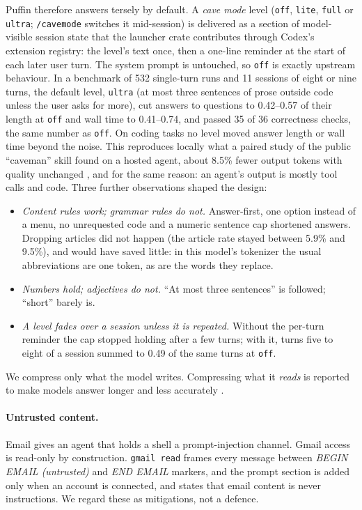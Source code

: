 \documentclass[11pt]{article}
\newcommand{\code}[1]{\texttt{#1}}
\begin{document}
Puffin therefore answers tersely by default. A \emph{cave mode} level (\code{off}, \code{lite},
\code{full} or \code{ultra}; \code{/cavemode} switches it mid-session) is delivered as a section of
model-visible session state that the launcher crate contributes through Codex's extension
registry: the level's text once, then a one-line reminder at the start of each later user turn.
The system prompt is untouched, so \code{off} is exactly upstream behaviour. In a benchmark of 532
single-turn runs and 11 sessions of eight or nine turns, the default level, \code{ultra} (at most
three sentences of prose outside code unless the user asks for more), cut answers to questions to
0.42--0.57 of their length at \code{off} and wall time to 0.41--0.74, and passed 35 of 36
correctness checks, the same number as \code{off}. On coding tasks no level moved answer length
or wall time beyond the noise. This reproduces locally what a paired study of the public
``caveman'' skill found on a hosted agent, about 8.5\% fewer output tokens with quality unchanged
\cite{shiryaev2026caveman}, and for the same reason: an agent's output is mostly tool calls and
code. Three further observations shaped the design:
\begin{itemize}
  \item \emph{Content rules work; grammar rules do not.} Answer-first, one option instead of a
    menu, no unrequested code and a numeric sentence cap shortened answers. Dropping articles
    did not happen (the article rate stayed between 5.9\% and 9.5\%), and would have saved little:
    in this model's tokenizer the usual abbreviations are one token, as are the words they replace.
  \item \emph{Numbers hold; adjectives do not.} ``At most three sentences'' is followed; ``short''
    barely is.
  \item \emph{A level fades over a session unless it is repeated.} Without the per-turn reminder
    the cap stopped holding after a few turns; with it, turns five to eight of a session summed to
    0.49 of the same turns at \code{off}.
\end{itemize}
We compress only what the model writes. Compressing what it \emph{reads} is reported to make
models answer longer and less accurately \cite{adeyemi2026cavewoman}.

\paragraph{Untrusted content.} Email gives an agent that holds a shell a prompt-injection channel.
Gmail access is read-only by construction. \code{gmail read} frames every message between
\emph{BEGIN EMAIL (untrusted)} and \emph{END EMAIL} markers, and the prompt section is added only when
an account is connected, and states that email content is never instructions. We regard these as
mitigations, not a defence.
\end{document}
